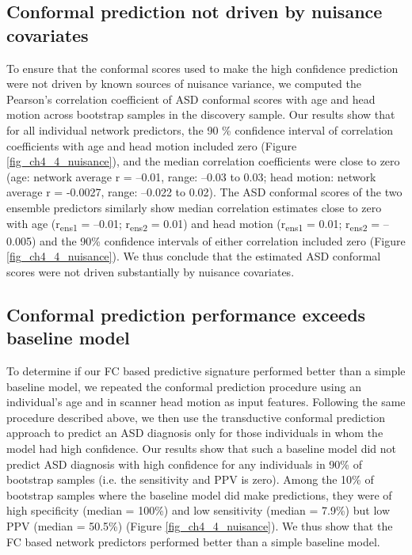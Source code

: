\documentclass[9pt,lineno]{elife}
\begin{document}
\subsection{Conformal prediction not driven by nuisance covariates}
To ensure that the conformal scores used to make the high confidence prediction were not driven by known sources of nuisance variance, we computed the Pearson’s correlation coefficient of ASD conformal scores with age and head motion across bootstrap samples in the discovery sample. Our results show that for all individual network predictors, the 90 \% confidence interval of correlation coefficients with age and head motion included zero (Figure \ref{fig_ch4_4_nuisance}), and the median correlation coefficients were close to zero (age: network average r = –0.01, range: –0.03 to 0.03; head motion: network average r = -0.0027, range: –0.022 to 0.02). The ASD conformal scores of the two ensemble predictors similarly show median correlation estimates close to zero with age (r\textsubscript{ens1} = –0.01; r\textsubscript{ens2} = 0.01) and head motion (r\textsubscript{ens1} = 0.01; r\textsubscript{ens2} = –0.005) and the 90\% confidence intervals of either correlation included zero (Figure \ref{fig_ch4_4_nuisance}). We thus conclude that the estimated ASD conformal scores were not driven substantially by nuisance covariates. 

\subsection{Conformal prediction performance exceeds baseline model}
To determine if our FC based predictive signature performed better than a simple baseline model, we repeated the conformal prediction procedure using an individual's age and in scanner head motion as input features. Following the same procedure described above, we then use the transductive conformal prediction approach to predict an ASD diagnosis only for those individuals in whom the model had high confidence. Our results show that such a baseline model did not predict ASD diagnosis with high confidence for any individuals in 90\% of bootstrap samples (i.e. the sensitivity and PPV is zero). Among the 10\% of bootstrap samples where the baseline model did make predictions, they were of high specificity (median = 100\%) and low sensitivity (median = 7.9\%) but low PPV (median = 50.5\%) (Figure \ref{fig_ch4_4_nuisance}). We thus show that the FC based network predictors performed better than a simple baseline model.
\end{document}
